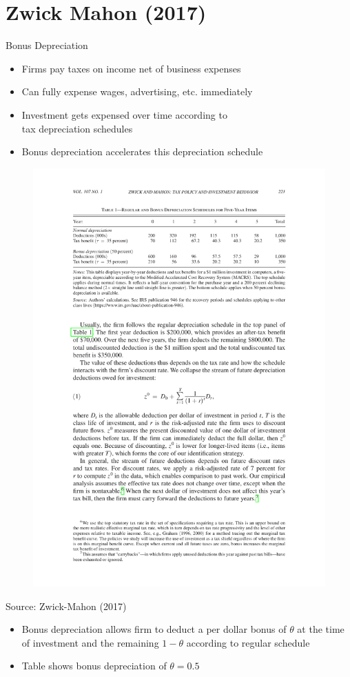 \documentclass[english,xcolor=svgnames,aspectratio=169]{beamer}
\begin{document}
\section{Zwick Mahon (2017)}

\begin{frame}{Bonus Depreciation}
\begin{itemize}
	\itemsep1em 
	\item Firms pay taxes on income net of business expenses
	\item Can fully expense wages, advertising, etc. immediately
	\item Investment gets expensed over time according to \\ tax depreciation schedules 
	\item Bonus depreciation accelerates this depreciation schedule
\end{itemize}
\end{frame}


\begin{frame}
\begin{figure}
	\centering
	\includegraphics[width=0.65 \textwidth]{figures/ZwickMahon2017Table1.pdf}
\end{figure}
\vspace{-4mm}
{\scriptsize Source: Zwick-Mahon (2017)}
{\small 
\begin{itemize}
	\item Bonus depreciation allows firm to deduct a per dollar bonus of $\theta$ at the time of investment and the remaining $1-\theta$ according to regular schedule
	\item Table shows bonus depreciation of $\theta = 0.5$
\end{itemize} }
\end{frame}
\end{document}
